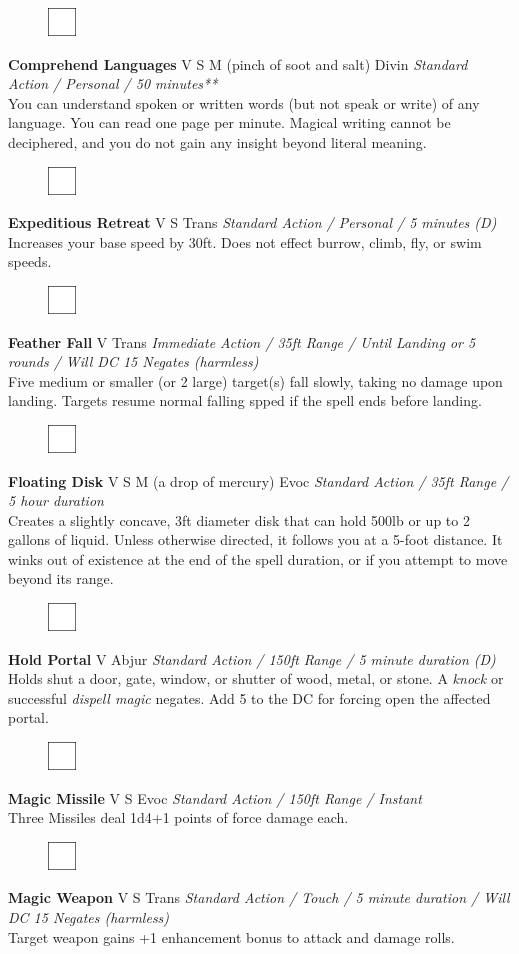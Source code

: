 \documentclass[letterpaper]{article}
\newcommand{\spell}[7]{
\begin{figure}
\vspace{-13pt}
\ifstrequal{#2}{Full}{\includegraphics[width=2em]{Checkbox-Full}}{
                      \includegraphics[width=2em]{Checkbox}}
\ifstrequal{#7}{}{\vspace{-1em}}{\vspace{#7}}
\end{figure}
\noindent \textbf{#1} #3 {
    \ifstrequal{#4}{Conj}{\color{Plum}Conj}{%
    \ifstrequal{#4}{Divin}{\color{YellowOrange}Divin}{%
    \ifstrequal{#4}{Ench}{\color{VioletRed}Ench}{%
    \ifstrequal{#4}{Trans}{\color{LimeGreen}Trans}{%
    \ifstrequal{#4}{Evoc}{\color{RedOrange}Evoc}{%
    \ifstrequal{#4}{Illu}{\color{ProcessBlue}Illu}{%
    \ifstrequal{#4}{Abjur}{\color{CadetBlue}Abjur}{%
    \ifstrequal{#4}{Necro}{\color{Red}Necro}{%
}}}}}}}}}
{\footnotesize \emph{#5}} \\
#6
}
\begin{document}
\spell{Comprehend Languages}{}{V S M (pinch of soot and salt)}{Divin}{Standard Action / Personal / 50 minutes**}{%
You can understand spoken or written words (but not speak or write) of any language. You can read one page per minute. Magical writing cannot be deciphered, and you do not gain any insight beyond literal meaning.}{} %

\spell{Expeditious Retreat}{}{V S}{Trans}{Standard Action / Personal / 5 minutes (D)}{%
Increases your base speed by 30ft.  Does not effect burrow, climb, fly, or swim speeds.}{}\\[-1em] %

\spell{Feather Fall}{}{V}{Trans}{Immediate Action / 35ft Range / Until Landing or 5 rounds / Will DC 15 Negates (harmless)}{%
Five medium or smaller (or 2 large) target(s) fall slowly, taking no damage upon landing. Targets resume normal falling spped if the spell ends before landing.}{} %

\spell{Floating Disk}{}{V S M (a drop of mercury)}{Evoc}{Standard Action / 35ft Range / 5 hour duration}{%
Creates a slightly concave, 3ft diameter disk that can hold 500lb or up to 2 gallons of liquid. Unless otherwise directed, it follows you at a 5-foot distance.  It winks out of existence at the end of the spell duration, or if you attempt to move beyond its range.}{0em} %

\spell{Hold Portal}{}{V}{Abjur}{Standard Action / 150ft Range / 5 minute duration (D)}{%
Holds shut a door, gate, window, or shutter of wood, metal, or stone.  A \emph{knock} or successful \emph{dispell magic} negates. Add 5 to the DC for forcing open the affected portal.}{} %

\spell{Magic Missile}{}{V S}{Evoc}{Standard Action / 150ft Range / Instant}{%
Three Missiles deal 1d4+1 points of force damage each.}{} \\[-1em] %

\spell{Magic Weapon}{}{V S}{Trans}{Standard Action / Touch / 5 minute duration / Will DC 15 Negates \mbox{(harmless)}}{%
Target weapon gains +1 enhancement bonus to attack and damage rolls.}{}\\[-1em] %
\end{document}
